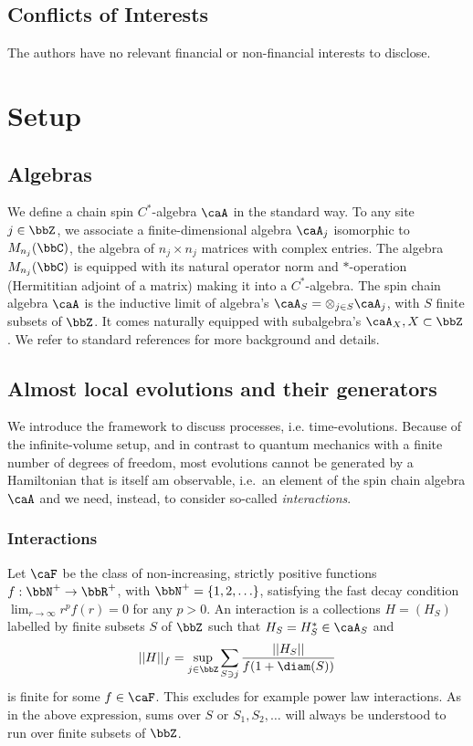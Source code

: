 \subsection*{Conflicts of Interests} The authors have no relevant financial or non-financial interests to disclose.



\section{Setup}   \label{sec: setup}
\subsection{Algebras}
We define a chain spin $C^*$-algebra $\caA$ in the standard way.
To any site $j \in \bbZ$, we associate a finite-dimensional algebra $\caA_j$ isomorphic to  $M_{n_j}(\bbC)$, the algebra of $n_j\times n_j$ matrices with complex entries. The algebra $M_{n_j}(\bbC)$ is equipped with its natural operator norm and $*$-operation (Hermititian adjoint of a matrix) making it into a $C^*$-algebra.  The spin chain algebra $\caA$ is the inductive limit of 
algebra's $\caA_S=\otimes_{j\in S} \caA_j$, with  $S$ finite subsets of $\bbZ$. 
It comes naturally equipped with subalgebra's $\caA_X, X\subset \bbZ$. We refer to standard references \cite{BratRob2,simon2014statistical,naaijkens2017quantum} for more background and details.





\subsection{Almost local evolutions and their generators}
We introduce the framework to discuss processes, i.e. time-evolutions.  Because of the infinite-volume setup, and in contrast to quantum mechanics with a finite number of degrees of freedom, most evolutions cannot be generated by a Hamiltonian that is itself am observable, i.e.\ an element of the  spin chain algebra $\caA$ and we need, instead, to consider so-called \emph{interactions}.  

\subsubsection{Interactions}\label{sec: interactions}
Let $\caF$ be the class of non-increasing, strictly positive functions $f:\bbN^+\to\bbR^+$, with $\bbN^+=\{1,2,\ldots\}$, satisfying the fast decay condition $\lim_{r\to\infty}r^pf(r)=0$ for any $p>0$. 
An interaction is a collections $H=(H_S)$ labelled by finite subsets $S$ of $\bbZ$ such that $H_S=H^*_S \in\caA_S$ and
$$
|| H ||_f  = \sup_{j\in\bbZ}  \sum_{S \ni j} \frac{||H_S||}{f(1+\diam(S))}
$$
is finite for some $f \in\caF$. This excludes for example power law interactions. As in the above expression, sums over $S$ or $S_1,S_2,\ldots$ will always be understood to run over  finite subsets of $\bbZ$.


